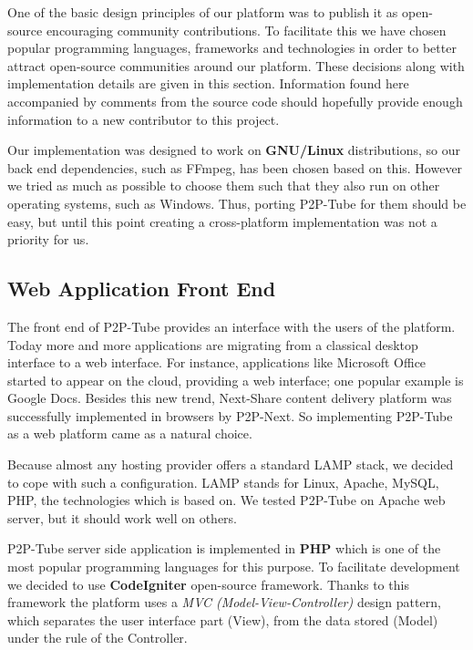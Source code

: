 One of the basic design principles of our platform was to publish it as open-source encouraging community contributions. To facilitate this we have chosen popular programming languages, frameworks and technologies in order to better attract open-source communities around our platform. These decisions along with implementation details are given in this section. Information found here accompanied by comments from the source code should hopefully provide enough information to a new contributor to this project.

Our implementation was designed to work on \textbf{GNU/Linux} distributions, so our back end dependencies, such as FFmpeg, has been chosen based on this. However we tried as much as possible to choose them such that they also run on other operating systems, such as Windows. Thus, porting P2P-Tube for them should be easy, but until this point creating a cross-platform implementation was not a priority for us.

\subsection{Web Application Front End}
\label{subsec:front-end}

The front end of P2P-Tube provides an interface with the users of the platform. Today more and more applications are migrating from a classical desktop interface to a web interface. For instance, applications like Microsoft Office started to appear on the cloud, providing a web interface; one popular example is Google Docs. Besides this new trend, Next-Share content delivery platform was successfully implemented in browsers by P2P-Next. So implementing P2P-Tube as a web platform came as a natural choice.

Because almost any hosting provider offers a standard LAMP stack, we decided to cope with such a configuration. LAMP stands for Linux, Apache, MySQL, PHP, the technologies which is based on. We tested P2P-Tube on Apache web server, but it should work well on others.

P2P-Tube server side application is implemented in \textbf{PHP} which is one of the most popular programming languages for this purpose. To facilitate development we decided to use \textbf{CodeIgniter} \cite{code-igniter} open-source framework. Thanks to this framework the platform uses a \textit{MVC (Model-View-Controller)} design pattern, which separates the user interface part (View), from the data stored (Model) under the rule of the Controller.

